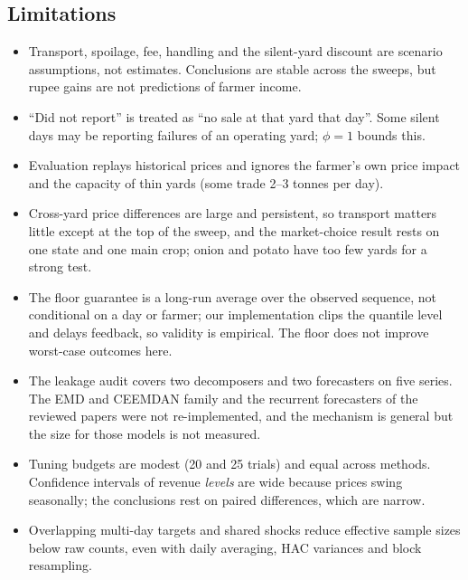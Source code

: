 \documentclass{ieeeaccess}
\begin{document}
\subsection{Limitations}
\begin{itemize}
\item Transport, spoilage, fee, handling and the silent-yard discount are scenario assumptions, not estimates. Conclusions are stable across the sweeps, but rupee gains are not predictions of farmer income.
\item ``Did not report'' is treated as ``no sale at that yard that day''. Some silent days may be reporting failures of an operating yard; $\phi=1$ bounds this.
\item Evaluation replays historical prices and ignores the farmer's own price impact and the capacity of thin yards (some trade 2--3 tonnes per day).
\item Cross-yard price differences are large and persistent, so transport matters little except at the top of the sweep, and the market-choice result rests on one state and one main crop; onion and potato have too few yards for a strong test.
\item The floor guarantee is a long-run average over the observed sequence, not conditional on a day or farmer; our implementation clips the quantile level and delays feedback, so validity is empirical. The floor does not improve worst-case outcomes here.
\item The leakage audit covers two decomposers and two forecasters on five series. The EMD and CEEMDAN family and the recurrent forecasters of the reviewed papers were not re-implemented, and the mechanism is general but the size for those models is not measured.
\item Tuning budgets are modest (20 and 25 trials) and equal across methods. Confidence intervals of revenue \emph{levels} are wide because prices swing seasonally; the conclusions rest on paired differences, which are narrow.
\item Overlapping multi-day targets and shared shocks reduce effective sample sizes below raw counts, even with daily averaging, HAC variances and block resampling.
\end{itemize}

\end{document}
